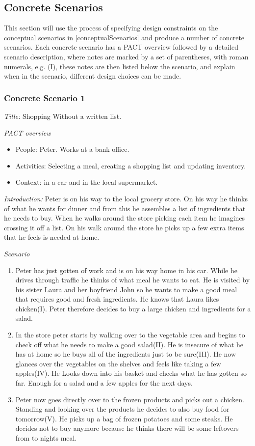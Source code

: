 \subsection{Concrete Scenarios}
This section will use the process of specifying design constraints on the conceptual scenarios in \cref{conceptualScenarios} and produce a number of concrete scenarios. Each concrete scenario has a PACT overview followed by a detailed scenario description, where notes are marked by a set of parentheses, with roman numerals, e.g. (I), these notes are then listed below the scenario, and explain when in the scenario, different design choices can be made.

\subsubsection{Concrete Scenario 1}\label{ConcreteScenario1}

\emph{Title:} Shopping Without a written list.

\emph{PACT overview}
\begin{itemize}
\item People: Peter. Works at a bank office.
\item Activities: Selecting a meal, creating a shopping list and updating inventory.  
\item Context: in a car and in the local supermarket.
\end{itemize}

\emph{Introduction:} Peter is on his way to the local grocery store. On his way he thinks of what he wants for dinner and from this he assembles a list of ingredients that he needs to buy. When he walks around the store picking each item he imagines crossing it off a list. On his walk around the store he picks up a few extra items that he feels is needed at home.

\emph{Scenario}
\begin{enumerate}
\item Peter has just gotten of work and is on his way home in his car. While he drives through traffic he thinks of what meal he wants to eat. He is visited by his sister Laura and her boyfriend John so he wants to make a good meal that requires good and fresh ingredients. He knows that Laura likes chicken(I). Peter therefore decides to buy a large chicken and ingredients for a salad. 
\item In the store peter starts by walking over to the vegetable area and begins to check off what he needs to make a good salad(II). He is insecure of what he has at home so he buys all of the ingredients just to be sure(III). He now glances over the vegetables on the shelves and feels like taking a few apples(IV). He Looks down into his basket and checks what he has gotten so far. Enough for a salad and a few apples for the next days.
\item Peter now goes directly over to the frozen products and picks out a chicken. Standing and looking over the products he decides to also buy food for tomorrow(V). He picks up a bag of frozen potatoes and some steaks. He decides not to buy anymore because he thinks there will be some leftovers from to nights meal.  
\end{enumerate}

